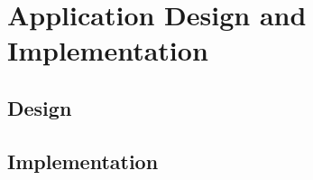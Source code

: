 \ifx\isEmbedded\undefined

\graphicspath{{../img/}}

\fi

\chapter{Application Design and Implementation}
\label{chap:application_design_implementation}

\section{Design}

\section{Implementation}


\ifx\isEmbedded\undefined


\pagebreak

\fi